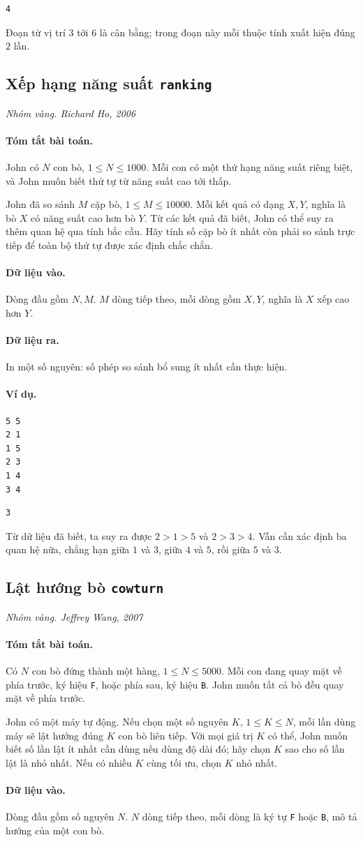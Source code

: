 \documentclass[11pt]{article}
\newcommand{\problem}[4]{%
  \subsection[#1 (#2)]{#1 \hfill {\normalsize\texttt{#2}}}%
  \noindent\textit{#3. #4}\par\smallskip
}
\newcommand{\iosec}[1]{\paragraph{#1}}
\begin{document}
\begin{verbatim}
4
\end{verbatim}

Đoạn từ vị trí \(3\) tới \(6\) là cân bằng; trong đoạn này mỗi thuộc tính xuất
hiện đúng \(2\) lần.

\problem{Xếp hạng năng suất}{ranking}{Nhóm vàng}{Richard Ho, 2006}

\iosec{Tóm tắt bài toán.}
John có \(N\) con bò, \(1\le N\le 1000\). Mỗi con có một thứ hạng năng suất
riêng biệt, và John muốn biết thứ tự từ năng suất cao tới thấp.

John đã so sánh \(M\) cặp bò, \(1\le M\le 10000\). Mỗi kết quả có dạng
\(X,Y\), nghĩa là bò \(X\) có năng suất cao hơn bò \(Y\). Từ các kết quả đã
biết, John có thể suy ra thêm quan hệ qua tính bắc cầu. Hãy tính số cặp bò
ít nhất còn phải so sánh trực tiếp để toàn bộ thứ tự được xác định chắc chắn.

\iosec{Dữ liệu vào.}
Dòng đầu gồm \(N,M\). \(M\) dòng tiếp theo, mỗi dòng gồm \(X,Y\), nghĩa là
\(X\) xếp cao hơn \(Y\).

\iosec{Dữ liệu ra.}
In một số nguyên: số phép so sánh bổ sung ít nhất cần thực hiện.

\iosec{Ví dụ.}
\begin{verbatim}
5 5
2 1
1 5
2 3
1 4
3 4
\end{verbatim}

\begin{verbatim}
3
\end{verbatim}

Từ dữ liệu đã biết, ta suy ra được \(2>1>5\) và \(2>3>4\). Vẫn cần xác định
ba quan hệ nữa, chẳng hạn giữa \(1\) và \(3\), giữa \(4\) và \(5\), rồi giữa
\(5\) và \(3\).

\problem{Lật hướng bò}{cowturn}{Nhóm vàng}{Jeffrey Wang, 2007}

\iosec{Tóm tắt bài toán.}
Có \(N\) con bò đứng thành một hàng, \(1\le N\le 5000\). Mỗi con đang quay mặt
về phía trước, ký hiệu \texttt{F}, hoặc phía sau, ký hiệu \texttt{B}. John
muốn tất cả bò đều quay mặt về phía trước.

John có một máy tự động. Nếu chọn một số nguyên \(K\), \(1\le K\le N\), mỗi
lần dùng máy sẽ lật hướng đúng \(K\) con bò liên tiếp. Với mọi giá trị \(K\)
có thể, John muốn biết số lần lật ít nhất cần dùng nếu dùng độ dài đó; hãy
chọn \(K\) sao cho số lần lật là nhỏ nhất. Nếu có nhiều \(K\) cùng tối ưu,
chọn \(K\) nhỏ nhất.

\iosec{Dữ liệu vào.}
Dòng đầu gồm số nguyên \(N\). \(N\) dòng tiếp theo, mỗi dòng là ký tự
\texttt{F} hoặc \texttt{B}, mô tả hướng của một con bò.
\end{document}
